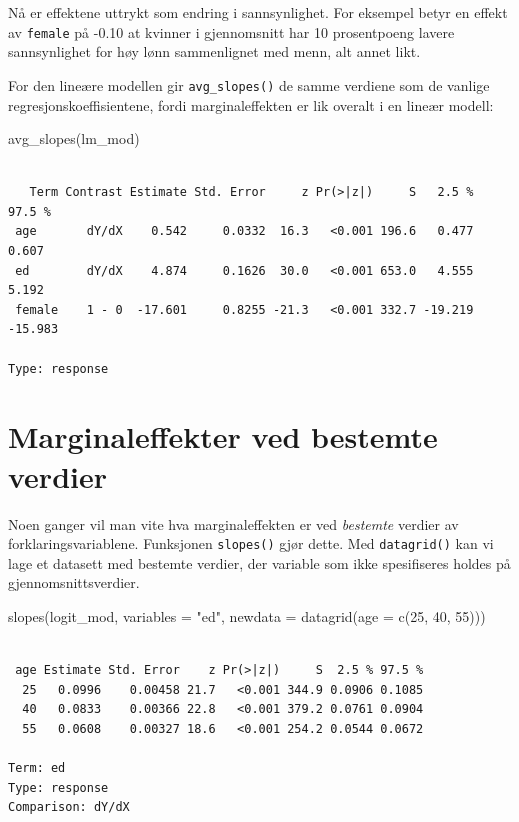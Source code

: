 \documentclass[
  norsk,
  letterpaper,
  DIV=11,
  numbers=noendperiod]{scrreprt}
\newenvironment{Shaded}{\begin{snugshade}}{\end{snugshade}}
\newcommand{\AttributeTok}[1]{\textcolor[rgb]{0.40,0.45,0.13}{#1}}
\newcommand{\DecValTok}[1]{\textcolor[rgb]{0.68,0.00,0.00}{#1}}
\newcommand{\FunctionTok}[1]{\textcolor[rgb]{0.28,0.35,0.67}{#1}}
\newcommand{\NormalTok}[1]{\textcolor[rgb]{0.00,0.23,0.31}{#1}}
\newcommand{\StringTok}[1]{\textcolor[rgb]{0.13,0.47,0.30}{#1}}
\theoremstyle{definition}
\theoremstyle{remark}
\begin{document}
Nå er effektene uttrykt som endring i sannsynlighet. For eksempel betyr
en effekt av \texttt{female} på -0.10 at kvinner i gjennomsnitt har 10
prosentpoeng lavere sannsynlighet for høy lønn sammenlignet med menn,
alt annet likt.

For den lineære modellen gir \texttt{avg\_slopes()} de samme verdiene
som de vanlige regresjonskoeffisientene, fordi marginaleffekten er lik
overalt i en lineær modell:

\begin{Shaded}
\begin{Highlighting}[]
\FunctionTok{avg\_slopes}\NormalTok{(lm\_mod)}
\end{Highlighting}
\end{Shaded}

\begin{verbatim}

   Term Contrast Estimate Std. Error     z Pr(>|z|)     S   2.5 %  97.5 %
 age       dY/dX    0.542     0.0332  16.3   <0.001 196.6   0.477   0.607
 ed        dY/dX    4.874     0.1626  30.0   <0.001 653.0   4.555   5.192
 female    1 - 0  -17.601     0.8255 -21.3   <0.001 332.7 -19.219 -15.983

Type: response
\end{verbatim}

\section{Marginaleffekter ved bestemte
verdier}\label{marginaleffekter-ved-bestemte-verdier}

Noen ganger vil man vite hva marginaleffekten er ved \emph{bestemte}
verdier av forklaringsvariablene. Funksjonen \texttt{slopes()} gjør
dette. Med \texttt{datagrid()} kan vi lage et datasett med bestemte
verdier, der variable som ikke spesifiseres holdes på
gjennomsnittsverdier.

\begin{Shaded}
\begin{Highlighting}[]
\FunctionTok{slopes}\NormalTok{(logit\_mod,}
       \AttributeTok{variables =} \StringTok{"ed"}\NormalTok{,}
       \AttributeTok{newdata =} \FunctionTok{datagrid}\NormalTok{(}\AttributeTok{age =} \FunctionTok{c}\NormalTok{(}\DecValTok{25}\NormalTok{, }\DecValTok{40}\NormalTok{, }\DecValTok{55}\NormalTok{)))}
\end{Highlighting}
\end{Shaded}

\begin{verbatim}

 age Estimate Std. Error    z Pr(>|z|)     S  2.5 % 97.5 %
  25   0.0996    0.00458 21.7   <0.001 344.9 0.0906 0.1085
  40   0.0833    0.00366 22.8   <0.001 379.2 0.0761 0.0904
  55   0.0608    0.00327 18.6   <0.001 254.2 0.0544 0.0672

Term: ed
Type: response
Comparison: dY/dX
\end{verbatim}
\end{document}
